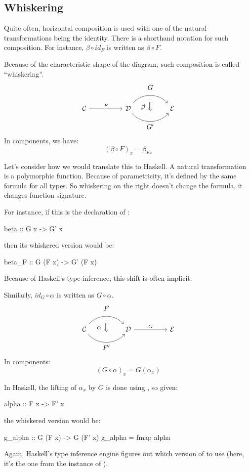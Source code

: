 \documentclass[DaoFP]{subfiles}
\begin{document}
\subsection{Whiskering}

Quite often, horizontal composition is used with one of the natural transformations being the identity. There is a shorthand notation for such composition. For instance, $\beta \circ id_F$ is written as $\beta \circ F$. 

Because of the characteristic shape of the diagram, such composition is called ``whiskering''.
\[
\begin{tikzcd}[column sep=huge]
\mathcal{C}
 \arrow[r, "F"]
 &
\mathcal{D}
  \arrow[bend left=50]{r}[name=U1, label=above:$G$]{}
  \arrow[bend right=50]{r}[name=D1, label=below:$G'$]{} 
 &
\mathcal{E}
  \arrow[shorten <=10pt,shorten >=10pt,Rightarrow,to path={(U1) -- node[label=left:$\beta$] {} (D1)}]{}
\end{tikzcd}
\]
In components, we have:
\[ (\beta \circ F)_x = \beta_{F x} \]

Let's consider how we would translate this to Haskell. A natural transformation is a polymorphic function. Because of parametricity, it's defined by the same formula for all types. So whiskering on the right doesn't change the formula, it changes function signature. 

For instance, if this is the declaration of :
\begin{haskell}
beta :: G x -> G' x
\end{haskell}
then its whiskered version would be:
\begin{haskell}
beta_F :: G (F x) -> G' (F x)
\end{haskell}
Because of Haskell's type inference, this shift is often implicit.

Similarly, $id_G \circ \alpha$ is written as $G \circ \alpha$.
\[
\begin{tikzcd}[column sep=huge]
\mathcal{C}
  \arrow[bend left=50]{r}[name=U, label=above:$F$]{}
  \arrow[bend right=50]{r}[name=D, label=below:$F'$]{} 
 &
\mathcal{D}
\arrow[r, "G"]
&
\mathcal{E}
  \arrow[shorten <=10pt,shorten >=10pt,Rightarrow,to path={(U) -- node[label=left:$\alpha$] {} (D)}]{}
\end{tikzcd}
\]
In components:
\[(G \circ \alpha)_x = G (\alpha_x) \]

In Haskell, the lifting of $\alpha_x$ by $G$ is done using , so given:
\begin{haskell}
alpha :: F x -> F' x
\end{haskell}
the whiskered version would be:
\begin{haskell}
g_alpha :: G (F x) -> G (F' x)
g_alpha = fmap alpha
\end{haskell}
Again, Haskell's type inference engine figures out which version of  to use (here, it's the one from the  instance of ).
\end{document}
